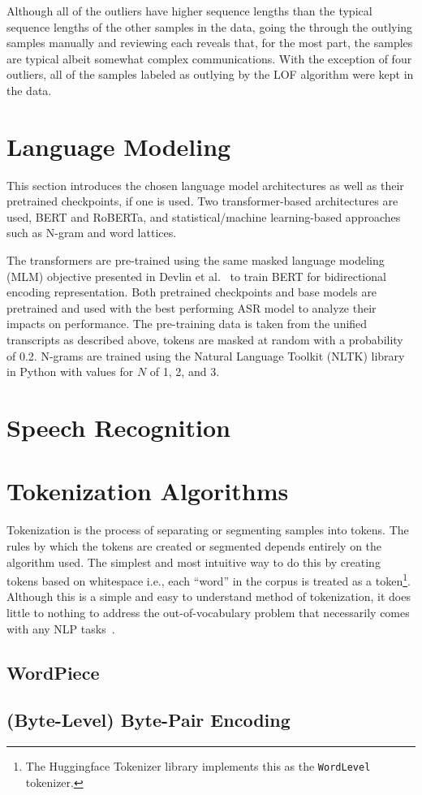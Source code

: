 \documentclass[12pt]{article}
\begin{document}
Although all of the outliers have higher sequence lengths than the typical sequence lengths of the other samples in the data, going the through
the outlying samples manually and reviewing each reveals that, for the most part, the samples are typical albeit somewhat complex communications.
With the exception of four outliers, all of the samples labeled as outlying by the LOF algorithm were kept in the data.

\section{Language Modeling}
This section introduces the chosen language model architectures as well as their pretrained checkpoints, if one is used. Two transformer-based
architectures are used, BERT and RoBERTa, and statistical/machine learning-based approaches such as N-gram and word lattices.

The transformers are pre-trained using the same masked language modeling (MLM) objective presented in Devlin et al.~\cite{devlin_bert_2019}
to train BERT for bidirectional encoding representation. Both pretrained checkpoints and base models are pretrained and used with the best performing
ASR model to analyze their impacts on performance. The pre-training data is taken from the unified transcripts as described above, tokens are masked
at random with a probability of 0.2. N-grams are trained using the Natural Language Toolkit (NLTK) library in Python with values for $N$ of 1, 2,
and 3.

\section{Speech Recognition}


\section{Tokenization Algorithms}
Tokenization is the process of separating or segmenting samples into tokens. The rules by which the tokens are created or segmented depends entirely
on the algorithm used. The simplest and most intuitive way to do this by creating tokens based on whitespace i.e., each ``word'' in the corpus
is treated as a token\footnote{The Huggingface Tokenizer library implements this as the \lstinline|WordLevel| tokenizer.}. Although this is a simple
and easy to understand method of tokenization, it does little to nothing to address the out-of-vocabulary problem that necessarily comes with any
NLP tasks~\cite{wu_googles_2016}.

\subsection{WordPiece}


\subsection{(Byte-Level) Byte-Pair Encoding}


\newpage


\end{document}
